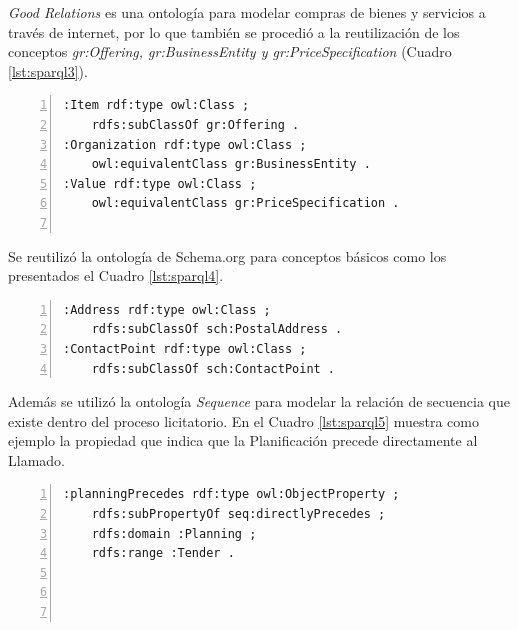  \textit{Good Relations} es una ontología para modelar compras de bienes y servicios a través de internet, por lo que también se procedió a la reutilización de los conceptos \textit{gr:Offering, gr:BusinessEntity y gr:PriceSpecification} (Cuadro \ref{lst:sparql3}).\hfill \break

\noindent\begin{minipage}{\textwidth}
 \begin{lstlisting}[captionpos=b, caption={Conceptos de Organization y Price}, label={lst:sparql3},  numbers=left,  numberstyle=\tiny\color{mygray},frame=single]
:Item rdf:type owl:Class ;
    rdfs:subClassOf gr:Offering .
:Organization rdf:type owl:Class ;
    owl:equivalentClass gr:BusinessEntity .
:Value rdf:type owl:Class ;
    owl:equivalentClass gr:PriceSpecification .


 \end{lstlisting}
\end{minipage}

 Se reutilizó la ontología de Schema.org para conceptos básicos como los presentados el Cuadro \ref{lst:sparql4}.\hfill \break

\noindent\begin{minipage}{\textwidth}
 \begin{lstlisting}[captionpos=b, caption={Reutilización de Schema.org}, label={lst:sparql4},  numbers=left,  numberstyle=\tiny\color{mygray},frame=single]
:Address rdf:type owl:Class ;
    rdfs:subClassOf sch:PostalAddress .
:ContactPoint rdf:type owl:Class ;
    rdfs:subClassOf sch:ContactPoint .
 \end{lstlisting}
\end{minipage}

 Además se utilizó la ontología \textit{Sequence} para modelar la relación de secuencia que existe dentro del proceso licitatorio. En el Cuadro \ref{lst:sparql5} muestra como ejemplo la propiedad que indica que la Planificación precede directamente al Llamado.\hfill \break


\noindent\begin{minipage}{\textwidth}
 \begin{lstlisting}[captionpos=b, caption={Reutilización del patrón de Secuencia}, label={lst:sparql5},  numbers=left,  numberstyle=\tiny\color{mygray},frame=single]
:planningPrecedes rdf:type owl:ObjectProperty ;
    rdfs:subPropertyOf seq:directlyPrecedes ;
    rdfs:domain :Planning ;
    rdfs:range :Tender .




 \end{lstlisting}
\end{minipage}

